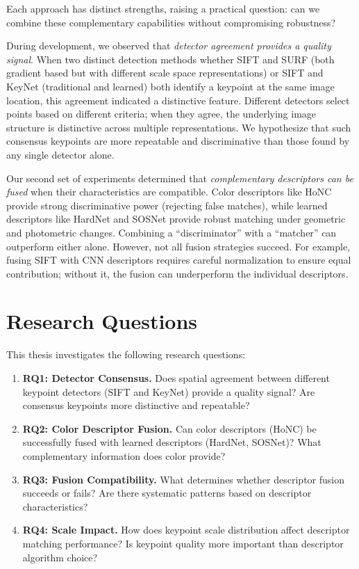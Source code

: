 Each approach has distinct strengths, raising a practical question: can we combine these complementary capabilities without compromising robustness?

During development, we observed that \textit{detector agreement provides a quality signal}. When two distinct detection methods whether SIFT and SURF (both gradient based but with different scale space representations) or SIFT and KeyNet (traditional and learned) both identify a keypoint at the same image location, this agreement indicated a distinctive feature. Different detectors select points based on different criteria; when they agree, the underlying image structure is distinctive across multiple representations. We hypothesize that such consensus keypoints are more repeatable and discriminative than those found by any single detector alone.

Our second set of experiments determined that \textit{complementary descriptors can be fused} when their characteristics are compatible. Color descriptors like HoNC provide strong discriminative power (rejecting false matches), while learned descriptors like HardNet and SOSNet provide robust matching under geometric and photometric changes. Combining a ``discriminator'' with a ``matcher'' can outperform either alone. However, not all fusion strategies succeed. For example, fusing SIFT with CNN descriptors requires careful normalization to ensure equal contribution; without it, the fusion can underperform the individual descriptors.

\section{Research Questions}

This thesis investigates the following research questions:

\begin{enumerate}
    \item \textbf{RQ1: Detector Consensus.} Does spatial agreement between different keypoint detectors (SIFT and KeyNet) provide a quality signal? Are consensus keypoints more distinctive and repeatable?

    \item \textbf{RQ2: Color Descriptor Fusion.} Can color descriptors (HoNC) be successfully fused with learned descriptors (HardNet, SOSNet)? What complementary information does color provide?

    \item \textbf{RQ3: Fusion Compatibility.} What determines whether descriptor fusion succeeds or fails? Are there systematic patterns based on descriptor characteristics?

    \item \textbf{RQ4: Scale Impact.} How does keypoint scale distribution affect descriptor matching performance? Is keypoint quality more important than descriptor algorithm choice?
\end{enumerate}

